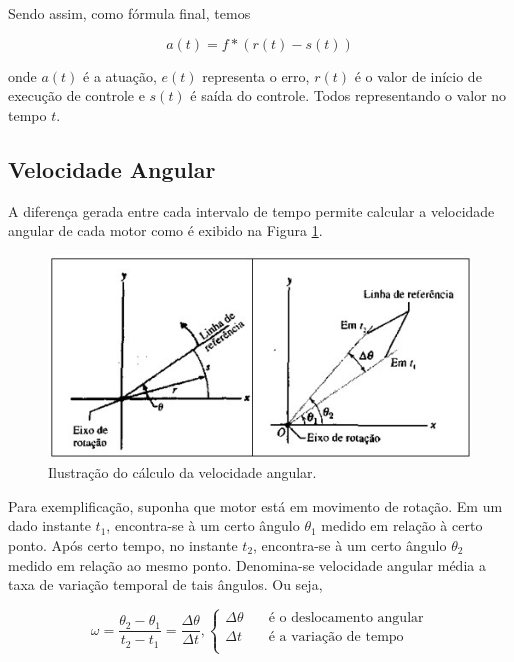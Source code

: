\documentclass[portugues, brazil, a4paper,12pt]{article}
\begin{document}
		Sendo assim, como fórmula final, temos

		\begin{equation}
			a(t) = f * (r(t) - s(t))
		\end{equation}

		onde $a(t)$ é a atuação, $e(t)$ representa o erro, $ r(t) $ é o valor de início de execução de controle e $ s(t) $ é saída do controle. Todos representando o valor no tempo $t$.


	\subsection{Velocidade Angular} \label{sec:velocidade_angular}
		A diferença gerada entre cada intervalo de tempo permite calcular a velocidade angular de cada motor como é exibido na Figura \ref{fig:angular_velocity}.

		\begin{figure}[h]
			\centering
			\includegraphics[width=0.65\linewidth]{img/math-angular_velocity.jpg}
			\caption{Ilustração do cálculo da velocidade angular.}
			\label{fig:angular_velocity}
		\end{figure}

		Para exemplificação, suponha que motor está em movimento de rotação. Em um dado instante $t_1$, encontra-se à um certo ângulo $\theta_1$ medido em relação à certo ponto. Após certo tempo, no instante $t_2$, encontra-se à um certo ângulo $\theta_2$ medido em relação ao mesmo ponto. Denomina-se velocidade angular média a taxa de variação temporal de tais ângulos. Ou seja,

		\begin{equation}
			\omega = \frac{\theta_2 - \theta_1}{t_2 - t_1} = \frac{\Delta \theta}{\Delta t},
			\begin{cases}
				\Delta \theta & \quad \text{é o deslocamento angular}\\
				\Delta t      & \quad \text{é a variação de tempo}\\
			\end{cases}
		\end{equation}
\end{document}
